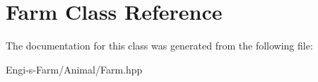 \hypertarget{class_farm}{}\section{Farm Class Reference}
\label{class_farm}


The documentation for this class was generated from the following file\+:\begin{DoxyCompactItemize}
\item 
Engi-\/s-\/\+Farm/\+Animal/Farm.\+hpp\end{DoxyCompactItemize}
